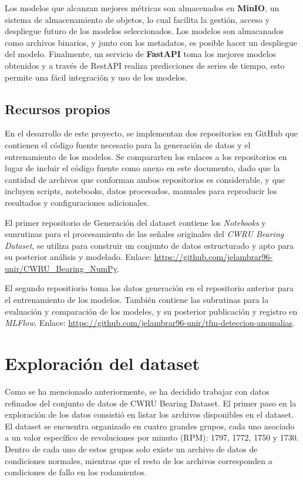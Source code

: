 \documentclass[11pt,a4paper,spanish]{book}
\numberwithin{equation}{chapter}
\numberwithin{figure}{chapter}
\begin{document}
Los modelos que alcanzan mejores métricas son almacenados en \textbf{MinIO},
un sistema de almacenamiento de objetos, lo cual facilita la gestión, acceso y despliegue 
futuro de los modelos seleccionados. Los modelos son almacanados como archivos binarios, y
junto con los metadatos, es posible hacer un despliegue del modelo. Finalmente, un servicio
de \textbf{FastAPI} toma los mejores modelos obtenidos y a través de RestAPI realiza predicciones
de series de tiempo, esto permite una fácil integración y uso de los modelos.


\subsection{Recursos propios}


En el desarrollo de este proyecto, se implementan dos repositorios en GitHub que 
contienen el código fuente necesario para la generación de datos y el entrenamiento de 
los modelos. 
Se compararten los enlaces a los repositorios en lugar de incluir el código fuente como 
anexo en este documento, dado que la cantidad de archivos que conforman ambos repositorios
es considerable, y que incluyen scripts, notebooks, datos procesados, manuales para 
reproducir los resultados y configuraciones adicionales.


El primer repositorio de Generación del dataset contiene los 
\textit{Notebooks} y sunrutinas para el 
procesamiento de las señales originales del \textit{CWRU Bearing Dataset}, 
se utiliza para construir un conjunto de datos estructurado y apto para su posterior 
análisis y modelado. Enlace: 
\href{https://github.com/jelambrar96-unir/CWRU_Bearing_NumPy}
{https://github.com/jelambrar96-unir/CWRU\_Bearing\_NumPy}.


El segundo repositiorio toma los datos generación en el repositorio anterior para el entrenamiento
de los modelos. También contiene las subrutinas para la evaluación y comparación de los modeles, 
y su posterior publicación y registro en \textit{MLFlow}. Enlace:
\href{https://github.com/jelambrar96-unir/tfm-deteccion-anomalias}
{https://github.com/jelambrar96-unir/tfm-deteccion-anomalias}.


\section{Exploración del dataset}


Como se ha mencionado anteriormente, se ha decidido trabajar con datos refinados del 
conjunto de datos de CWRU Bearing Dataset. El primer paso en la exploración de los datos
consistió en listar los archivos disponibles en el dataset. El dataset se encuentra 
organizado en cuatro grandes grupos, cada uno asociado a un valor específico de 
revoluciones por minuto (RPM): 1797, 1772, 1750 y 1730. Dentro de cada uno de estos 
grupos solo existe un archivo de datos de condiciones normales, mientras que el resto de
los archivos corresponden a condiciones de fallo en los rodamientos.
\end{document}
